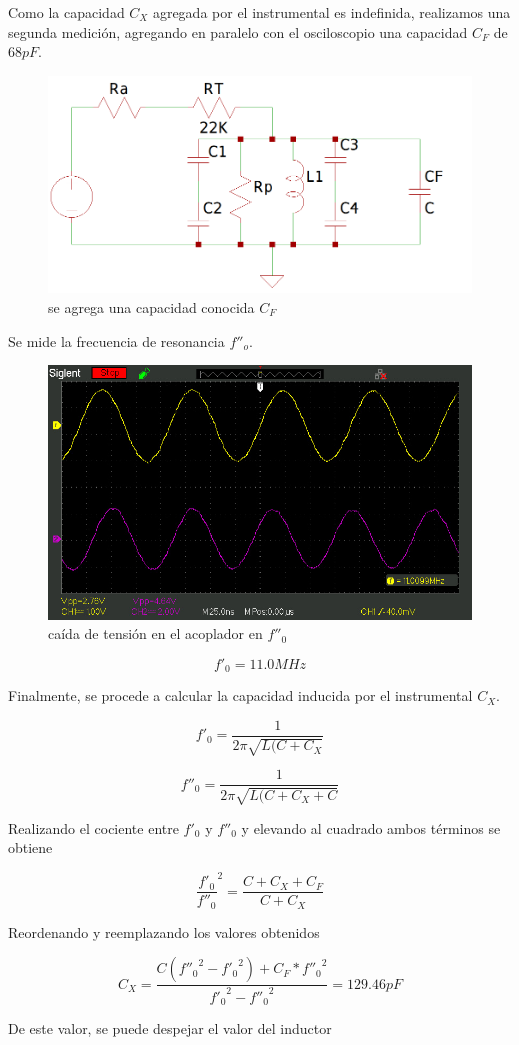 Como la capacidad $C_X$ agregada por el instrumental es indefinida, realizamos una segunda medición, agregando en paralelo con el osciloscopio una capacidad $C_F$ de $68pF$.

\begin{figure}[H]
    \centering
    \includegraphics[width=0.5\linewidth]{fig/ctest.png}
    \caption{se agrega una capacidad conocida $C_F$}
    \label{fig:enter-label}
\end{figure}

Se mide la frecuencia de resonancia $f''_o$.

\begin{figure}[H]
    \centering
    \includegraphics[width=0.5\linewidth]{oscilo/SDS00004.jpg}
    \caption{caída de tensión en el acoplador en $f''_0$}
    \label{fig:enter-label}
\end{figure}

$$
f'_0 = 11.0MHz
$$

Finalmente, se procede a calcular la capacidad inducida por el instrumental $C_X$.

$$
f'_0 = \frac{1}{2\pi\sqrt{L(C+C_X}}
$$

$$
f''_0 = \frac{1}{2\pi\sqrt{L(C+C_X+C}}
$$

Realizando el cociente entre $f'_{0}$ y $f''_{0}$ y elevando al cuadrado ambos términos se obtiene

$$
{\frac{f'_{0}}{f''_{0}}^2} = \frac{C+C_X+C_F}{C+C_X}
$$

Reordenando y reemplazando los valores obtenidos

$$
C_X = \frac{C({f''_{0}}^2-{f'_{0}}^2)+C_F*{f''_{0}}^2}{{f'_{0}}^2-{f''_{0}}^2} = 129.46pF
$$

De este valor, se puede despejar el valor del inductor

